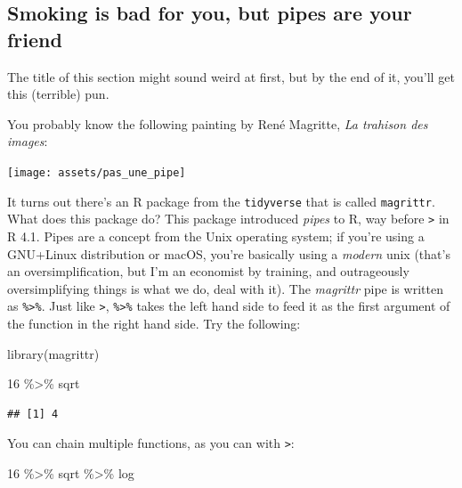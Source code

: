 \documentclass[
]{article}
\newenvironment{Shaded}{\begin{snugshade}}{\end{snugshade}}
\newcommand{\DecValTok}[1]{\textcolor[rgb]{0.00,0.00,0.81}{#1}}
\newcommand{\FunctionTok}[1]{\textcolor[rgb]{0.00,0.00,0.00}{#1}}
\newcommand{\NormalTok}[1]{#1}
\newcommand{\SpecialCharTok}[1]{\textcolor[rgb]{0.00,0.00,0.00}{#1}}
\begin{document}
\hypertarget{smoking-is-bad-for-you-but-pipes-are-your-friend}{%
\subsection{Smoking is bad for you, but pipes are your friend}\label{smoking-is-bad-for-you-but-pipes-are-your-friend}}

The title of this section might sound weird at first, but by the end of it, you'll get this
(terrible) pun.

You probably know the following painting by René Magritte, \emph{La trahison des images}:

\texttt{[image: assets/pas\_une\_pipe]}

It turns out there's an R package from the \texttt{tidyverse} that is called \texttt{magrittr}. What does this
package do? This package introduced \emph{pipes} to R, way before \texttt{\textbar{}\textgreater{}} in R 4.1. Pipes are a concept
from the Unix operating system; if you're using a GNU+Linux distribution or macOS, you're basically
using a \emph{modern} unix (that's an oversimplification, but I'm an economist by training, and
outrageously oversimplifying things is what we do, deal with it). The \emph{magrittr} pipe is written as
\texttt{\%\textgreater{}\%}. Just like \texttt{\textbar{}\textgreater{}}, \texttt{\%\textgreater{}\%} takes the left hand side to feed it as the first argument of the
function in the right hand side. Try the following:

\begin{Shaded}
\begin{Highlighting}[]
\FunctionTok{library}\NormalTok{(magrittr)}
\end{Highlighting}
\end{Shaded}

\begin{Shaded}
\begin{Highlighting}[]
\DecValTok{16} \SpecialCharTok{\%\textgreater{}\%}\NormalTok{ sqrt}
\end{Highlighting}
\end{Shaded}

\begin{verbatim}
## [1] 4
\end{verbatim}

You can chain multiple functions, as you can with \texttt{\textbar{}\textgreater{}}:

\begin{Shaded}
\begin{Highlighting}[]
\DecValTok{16} \SpecialCharTok{\%\textgreater{}\%}
\NormalTok{  sqrt }\SpecialCharTok{\%\textgreater{}\%}
\NormalTok{  log}
\end{Highlighting}
\end{Shaded}
\end{document}
